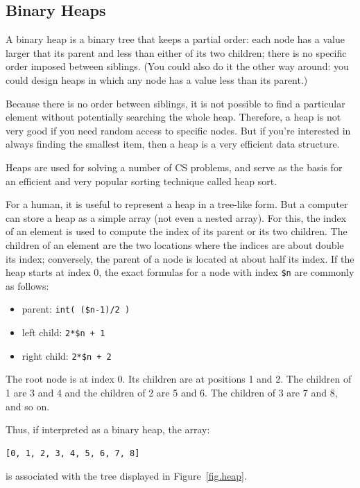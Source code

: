 \subsection{Binary Heaps}
\label{heap}

A binary heap is a binary tree that keeps a partial order: each 
node has a value larger that its parent and less than 
either of its two children; there is no specific order imposed 
between siblings. (You could also do it the other way 
around: you could design heaps in which any node has a value 
less than its parent.)

Because there is no order between siblings, it is not possible 
to find a particular element without potentially searching the 
whole heap. Therefore, a heap is not very good if you need 
random access to specific nodes. But if you're interested 
in always finding the smallest item, then a heap is a 
very efficient data structure.

Heaps are used for solving a number of CS problems, and serve 
as the basis for an efficient and very popular sorting technique 
called heap sort.

For a human, it is useful to represent a heap in a tree-like 
form. But a computer can store a heap as a simple array (not 
even a nested array). For this, the index of an element is 
used to compute the index of its parent or its two children.
The children of an element are the two locations where the 
indices are about double its index; conversely, the parent 
of a node is located at about half its index. If the heap 
starts at index 0, the exact formulas for a node with index 
\verb'$n' are commonly as follows:
\begin{itemize}
\item parent: \verb'int( ($n-1)/2 )'
\item left child: \verb'2*$n + 1'
\item right child: \verb'2*$n + 2'
\end{itemize}
The root node is at index 0. Its children are at positions 
1 and 2. The children of 1 are 3 and 4 and the children of 
2 are 5 and 6. The children of 3 are 7 and 8, and so on.

Thus, if interpreted as a binary heap, the array:
\begin{verbatim}
[0, 1, 2, 3, 4, 5, 6, 7, 8]
\end{verbatim}

is associated with the tree displayed in Figure~\ref{fig.heap}.

